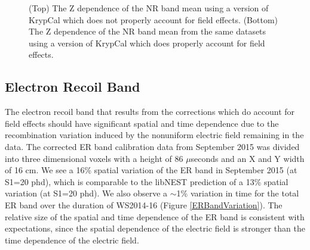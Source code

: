 \begin{figure}
\centering
{}
\qquad
{}
\caption{ (Top) The Z dependence of the NR band mean using a version of KrypCal which does not properly account for field effects. (Bottom) The Z dependence of the NR band mean from the same datasets using a version of KrypCal which does properly account for field effects.  }
\label{NRBandZ}
\end{figure}

\subsection{Electron Recoil Band}

The electron recoil band that results from the corrections which do account for field effects should have significant spatial and time dependence due to the recombination variation induced by the nonuniform electric field remaining in the data. The corrected ER band calibration data from September 2015 was divided into three dimensional voxels with a height of 86 $\mu$seconds and an X and Y width of 16 cm.  We see a 16\% spatial variation of the ER band in September 2015 (at S1=20 phd), which is comparable to the libNEST prediction of a 13\% spatial variation (at S1=20 phd).  We also observe a $\sim$1\% variation in time for the total ER band over the duration of WS2014-16 (Figure \ref{ERBandVariation}). The relative size of the spatial and time dependence of the ER band is consistent with expectations, since the spatial dependence of the electric field is stronger than the time dependence of the electric field. 

